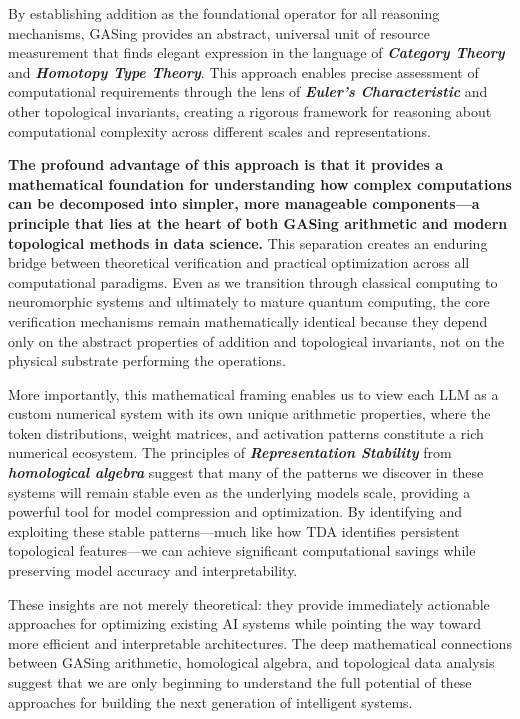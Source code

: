 By establishing addition as the foundational operator for all reasoning mechanisms, GASing provides an abstract, universal unit of resource measurement that finds elegant expression in the language of \textbf{\textit{Category Theory}} and \textbf{\textit{Homotopy Type Theory}}. This approach enables precise assessment of computational requirements through the lens of \textbf{\textit{Euler's Characteristic}} and other topological invariants, creating a rigorous framework for reasoning about computational complexity across different scales and representations.

\textbf{The profound advantage of this approach is that it provides a mathematical foundation for understanding how complex computations can be decomposed into simpler, more manageable components—a principle that lies at the heart of both GASing arithmetic and modern topological methods in data science.} This separation creates an enduring bridge between theoretical verification and practical optimization across all computational paradigms. Even as we transition through classical computing to neuromorphic systems and ultimately to mature quantum computing, the core verification mechanisms remain mathematically identical because they depend only on the abstract properties of addition and topological invariants, not on the physical substrate performing the operations.

More importantly, this mathematical framing enables us to view each LLM as a custom numerical system with its own unique arithmetic properties, where the token distributions, weight matrices, and activation patterns constitute a rich numerical ecosystem. The principles of \textbf{\textit{Representation Stability}} from \textbf{\textit{homological algebra}} suggest that many of the patterns we discover in these systems will remain stable even as the underlying models scale, providing a powerful tool for model compression and optimization. By identifying and exploiting these stable patterns—much like how TDA identifies persistent topological features—we can achieve significant computational savings while preserving model accuracy and interpretability.

These insights are not merely theoretical: they provide immediately actionable approaches for optimizing existing AI systems while pointing the way toward more efficient and interpretable architectures. The deep mathematical connections between GASing arithmetic, homological algebra, and topological data analysis suggest that we are only beginning to understand the full potential of these approaches for building the next generation of intelligent systems.
